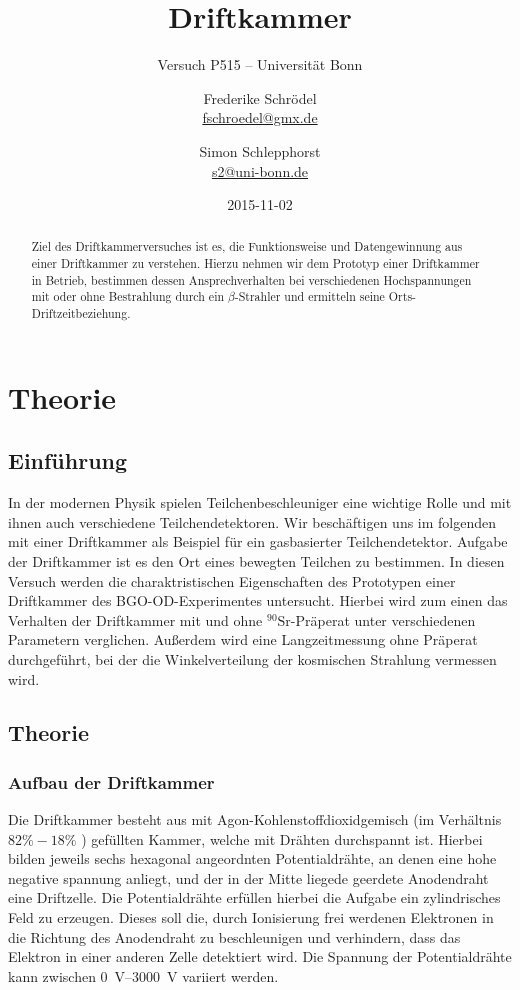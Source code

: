\documentclass[11pt, ngerman, fleqn, DIV=15, headinclude, BCOR=2cm]{scrreprt}
\title{Driftkammer}
\subtitle{Versuch P515 -- Universität Bonn}
\author{
	Frederike Schrödel \\
	\small{\href{mailto:fschroedel@gmx.de}{fschroedel@gmx.de}}
	\and
	Simon Schlepphorst \\
	\small{\href{mailto:s2@uni-bonn.de}{s2@uni-bonn.de}}
}
\date{2015-11-02}
\begin{document}
\maketitle

\begin{abstract}
Ziel des Driftkammerversuches ist es, die Funktionsweise und Datengewinnung aus einer Driftkammer zu verstehen.
Hierzu nehmen wir dem Prototyp einer Driftkammer in Betrieb, 
bestimmen dessen Ansprechverhalten bei verschiedenen Hochspannungen mit oder ohne Bestrahlung durch ein $\beta$-Strahler  
und ermitteln seine Orts-Driftzeitbeziehung.
\end{abstract}

\tableofcontents

\chapter{Theorie}

\section{Einführung}
In der modernen Physik spielen Teilchenbeschleuniger eine wichtige Rolle und mit ihnen auch verschiedene Teilchendetektoren.
Wir beschäftigen uns im folgenden mit einer Driftkammer als Beispiel für ein gasbasierter Teilchendetektor.
Aufgabe der Driftkammer ist es den Ort eines bewegten Teilchen zu bestimmen.
In diesen Versuch werden die charaktristischen Eigenschaften des Prototypen einer Driftkammer des BGO-OD-Experimentes untersucht.
Hierbei wird zum einen das Verhalten der Driftkammer mit und ohne
$^90\text{Sr}$-Präperat unter verschiedenen Parametern verglichen.
Außerdem wird eine Langzeitmessung ohne Präperat durchgeführt, bei der die Winkelverteilung der kosmischen Strahlung vermessen wird.

\section{Theorie}
\subsection{Aufbau der Driftkammer}
Die Driftkammer besteht aus mit Agon-Kohlenstoffdioxidgemisch (im Verhältnis $ 82\%-18\% $ ) gefüllten Kammer, welche mit Drähten durchspannt ist. 
Hierbei bilden jeweils sechs hexagonal angeordnten Potentialdrähte, an denen
eine hohe negative spannung anliegt, und der in der Mitte liegede geerdete Anodendraht eine Driftzelle.
Die Potentialdrähte erfüllen hierbei die Aufgabe ein zylindrisches Feld zu erzeugen. 
Dieses soll die, durch Ionisierung frei werdenen Elektronen in die Richtung
des Anodendraht zu beschleunigen und verhindern, dass das Elektron in einer anderen Zelle detektiert wird.
Die Spannung der Potentialdrähte kann zwischen \SIrange{0}{3000}{\volt} variiert werden.
\end{document}
